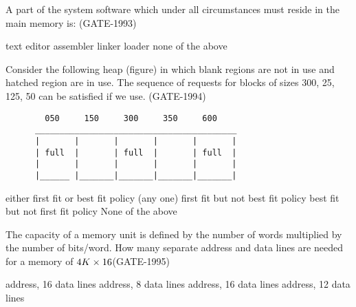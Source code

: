 
\begin{questyle}

  \question  A part of the system software which under all circumstances must reside in the main memory is: (GATE-1993)

  \begin{choices}
    \choice text editor
    \choice assembler
    \choice linker
    \choice loader
    \choice none of the above
  \end{choices}

\end{questyle}



\begin{questyle}

  \question Consider the following heap (figure) in which blank regions are not in use and hatched region are in use.
            The sequence of requests for blocks of sizes 300, 25, 125, 50 can be satisfied if we use. (GATE-1994)
  \begin{lstlisting}
        050     150     300     350     600
      _________________________________________
      |       |       |       |       |       |
      | full  |       | full  |       | full  |
      |       |       |       |       |       |
      |______ |_______|_______|_______|_______|
  \end{lstlisting}

  \begin{choices}
    \choice either first fit or best fit policy (any one)
    \choice first fit but not best fit policy
    \choice best fit but not first fit policy
    \choice None of the above
  \end{choices}

\end{questyle}


\begin{questyle}

  \question  The capacity of a memory unit is defined by the number of words multiplied by the number of bits/word. How many separate address and data lines are needed for a memory of \( \large 4K \times 16 \)(GATE-1995)

  \begin{choices}
     address, 16 data lines
     address, 8 data lines
     address, 16 data lines
     address, 12 data lines
  \end{choices}

\end{questyle}


